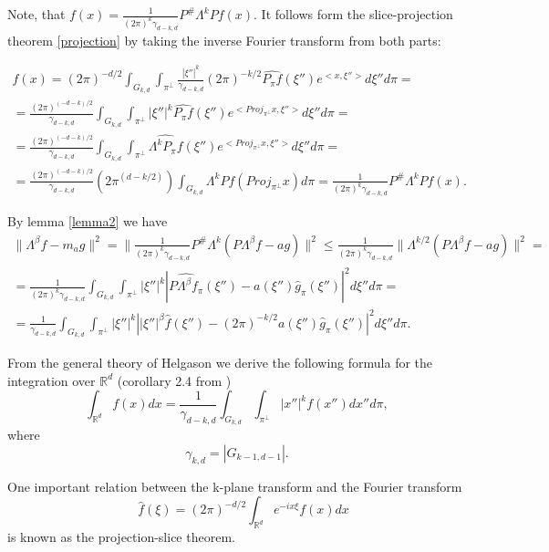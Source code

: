 \documentclass[12pt]{iopart}
\begin{document}
Note, that $f(x)=\frac{1}{(2\pi)^k\gamma_{d-k,d}}P^\#\Lambda^kPf(x)$. It follows form the slice-projection theorem \ref{projection} by taking the inverse Fourier transform from both parts:

\begin{multline*}
f(x) = (2\pi)^{-d/2}\int_{G_{k,d}}\int_{\pi^\perp}\frac{|\xi''|^k}{\gamma_{d-k,d}}(2\pi)^{-k/2}\widehat{P_\pi f}(\xi'')e^{<x,\xi''>}d\xi''d\pi = \\
= \frac{(2\pi)^{(-d-k)/2}}{\gamma_{d-k,d}}\int_{G_{k,d}}\int_{\pi^\perp}|\xi''|^k\widehat{P_\pi f}(\xi'')e^{<Proj_{\pi^\perp}x,\xi''>}d\xi''d\pi = \\
= \frac{(2\pi)^{(-d-k)/2}}{\gamma_{d-k,d}}\int_{G_{k,d}}\int_{\pi^\perp}\widehat{\Lambda^kP_\pi f}(\xi'')e^{<Proj_{\pi^\perp}x,\xi''>}d\xi''d\pi = \\
= \frac{(2\pi)^{(-d-k)/2}}{\gamma_{d-k,d}}(2\pi^{(d-k/2)})\int_{G_{k,d}}\Lambda^kP f(Proj_{\pi^\perp}x)d\pi = \frac{1}{(2\pi)^k\gamma_{d-k,d}}P^\#\Lambda^kPf(x).
\end{multline*}

By lemma \ref{lemma2} we have
\begin{multline*}
    \|\Lambda^\beta f-m_ag\|^2=\|\frac{1}{(2\pi)^k\gamma_{d-k,d}}P^\#\Lambda^k(P\Lambda^\beta f-ag)\|^2\le\frac{1}{(2\pi)^k\gamma_{d-k,d}}\|\Lambda^{k/2}(P\Lambda^\beta f-ag)\|^2=\\
    =\frac{1}{(2\pi)^k\gamma_{d-k,d}}\int_{G_{k,d}}\int_{\pi^\perp}|\xi''|^k\left|\widehat{P\Lambda^\beta f_\pi}(\xi'')-a(\xi'')\widehat g_\pi(\xi'')\right|^2d\xi'' d\pi=\\
    =\frac{1}{\gamma_{d-k,d}}\int_{G_{k,d}}\int_{\pi^\perp}|\xi''|^k\left||\xi''|^\beta\widehat{f}(\xi'')-(2\pi)^{-k/2}a(\xi'')\widehat g_\pi(\xi'')\right|^2d\xi'' d\pi.
\end{multline*}









From the general theory of Helgason \cite{H} we derive the following formula for the integration over $\mathbb R^d$ (corollary 2.4 from \cite{K})
\begin{equation}
\label{integral}
\int_{\mathbb R^d}f(x)dx=\frac{1}{\gamma_{d-k,d}}\int_{G_{k,d}}\int_{\pi^\perp}|x''|^kf(x'')dx''d\pi,
\end{equation}
where
$$
\gamma_{k,d}=|G_{k-1,d-1}|.
$$

One important relation between the k-plane transform and the Fourier transform
$$\quad \widehat f(\xi)=(2\pi)^{-d/2}\int_{\mathbb R^d}e^{-ix\xi}f(x)dx$$
is  known as the projection-slice theorem. 
\end{document}
